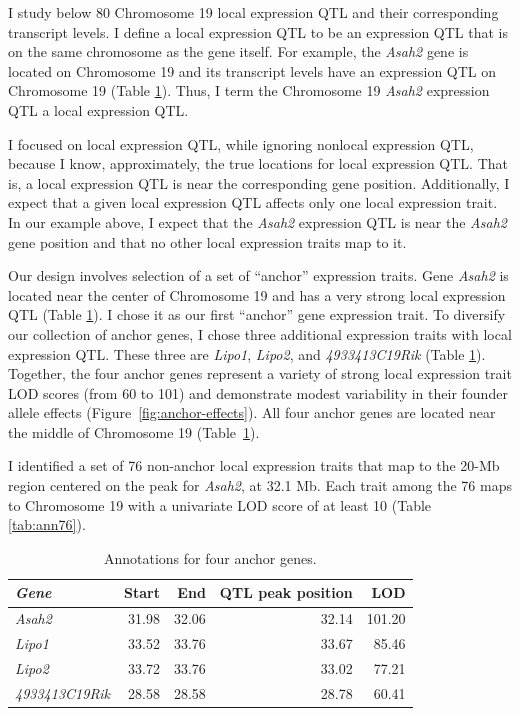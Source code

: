 \documentclass[oneside]{book}\usepackage[]{graphicx}\usepackage[]{color}
\begin{document}
I study below 80 Chromosome 19 local expression QTL and their corresponding transcript levels. I define a local expression QTL to be an expression QTL that is on the same chromosome as the gene itself. For example, the \emph{Asah2} gene is located on Chromosome 19 and its transcript levels have an expression QTL on Chromosome 19 (Table \ref{tab:ann4}). Thus, I term the Chromosome 19 \emph{Asah2} expression QTL a local expression QTL.

I focused on local expression QTL, while ignoring nonlocal expression QTL, 
because I know, approximately, the true locations for local expression QTL. 
That is, a local expression QTL is near the corresponding gene position. 
Additionally, I expect that a given local expression QTL affects only one local expression trait. 
In our example above, I expect that the \emph{Asah2} expression QTL is near the \emph{Asah2} gene 
position and that no other local expression traits map to it.


Our design involves selection of a set of ``anchor'' expression traits. Gene \emph{Asah2} is located near the center of Chromosome 19 and has a very strong local expression QTL (Table \ref{tab:ann4}). I chose it as our first ``anchor'' gene expression trait. To diversify our collection of anchor genes, I chose three additional expression traits with local expression QTL. These three are \emph{Lipo1}, \emph{Lipo2}, and \emph{4933413C19Rik} (Table \ref{tab:ann4}). Together, the four anchor genes represent a variety of strong local expression trait LOD scores (from 60 to 101) and demonstrate modest variability in their founder allele effects (Figure~\ref{fig:anchor-effects}). All four anchor genes are located near the middle of Chromosome 19 (Table~\ref{tab:ann4}).




I identified a set of 76 non-anchor local expression traits that map to the 20-Mb region centered on the peak for \emph{Asah2}, at 32.1 Mb. Each trait among the 76 maps to Chromosome 19 with a univariate LOD score of at least 10 (Table \ref{tab:ann76}).


\begin{table}[ht]
\caption{Annotations for four anchor genes.}\label{tab:ann4}
\centering
\begin{tabular}{>{\em}lrrrr}
  \hline
Gene & Start & End & QTL peak position & LOD \\
  \hline
Asah2 & 31.98 & 32.06 & 32.14 & 101.20 \\
  Lipo1 & 33.52 & 33.76 & 33.67 & 85.46 \\
  Lipo2 & 33.72 & 33.76 & 33.02 & 77.21 \\
  4933413C19Rik & 28.58 & 28.58 & 28.78 & 60.41 \\
   \hline
\end{tabular}
\end{table}
\end{document}
